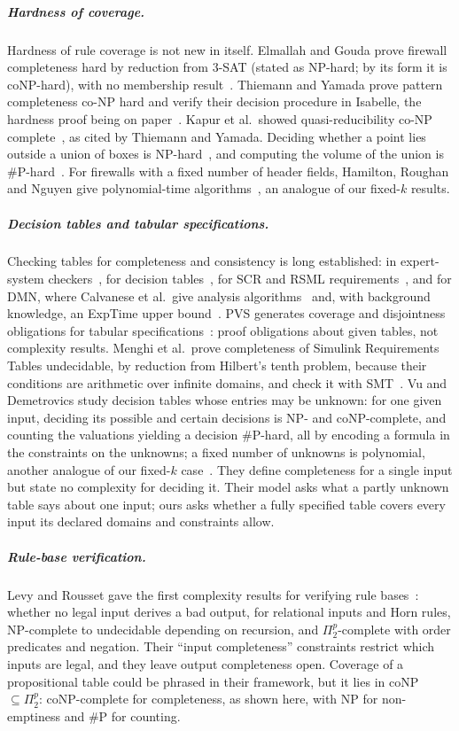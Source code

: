 \documentclass[a4paper,UKenglish,cleveref,autoref,thm-restate]{lipics-v2021}
\begin{document}
\subparagraph*{Hardness of coverage.}
Hardness of rule coverage is not new in itself. Elmallah and Gouda prove firewall completeness
hard by reduction from 3-SAT (stated as NP-hard; by its form it is coNP-hard), with no membership
result~\cite{ElmallahGouda2017}. Thiemann
and Yamada prove pattern completeness co-NP hard and verify their decision procedure in
Isabelle, the hardness proof being on paper~\cite{ThiemannYamada2026}. Kapur et al.\ showed
quasi-reducibility co-NP complete~\cite{KapurNRZ1991}, as cited by Thiemann and Yamada. Deciding
whether a point lies outside a union of boxes is NP-hard~\cite{Chan2010}, and computing the volume
of the union is \#P-hard~\cite{BringmannFriedrich2010}. For firewalls with a fixed number of header fields,
Hamilton, Roughan and Nguyen give polynomial-time algorithms~\cite{HamiltonRoughanNguyen2022},
an analogue of our fixed-$k$ results.

\subparagraph*{Decision tables and tabular specifications.}
Checking tables for completeness and consistency is long established: in expert-system
checkers~\cite{SuwaScottShortliffe1982}, for decision tables~\cite{VanthienenMA1998}, for SCR and
RSML requirements~\cite{HeitmeyerJL1996,HeimdahlLeveson1996}, and for DMN, where Calvanese et al.\
give analysis algorithms~\cite{CalvaneseDLMMT2016,CalvaneseDLMMT2018} and, with background
knowledge, an ExpTime upper bound~\cite{CalvaneseMDM2019}. PVS generates coverage and
disjointness obligations for tabular specifications~\cite{OwreRushbyShankar1997}: proof
obligations about given tables, not complexity results. Menghi et al.\ prove completeness of
Simulink Requirements Tables undecidable, by reduction from Hilbert's tenth problem, because
their conditions are arithmetic over infinite domains, and check it with
SMT~\cite{MenghiEtAl2025,ZanengaEtAl2025}. Vu and Demetrovics study decision tables whose entries
may be unknown: for one given input, deciding its possible and certain decisions is NP- and
coNP-complete, and counting the valuations yielding a decision \#P-hard, all by encoding a formula
in the constraints on the unknowns; a fixed number of unknowns is polynomial, another analogue of
our fixed-$k$ case~\cite{VuDemetrovics2026}. They define completeness for a single input but state
no complexity for deciding it. Their model asks what a partly unknown table says about one input;
ours asks whether a fully specified table covers every input its declared domains and constraints
allow.

\subparagraph*{Rule-base verification.}
Levy and Rousset gave the first complexity results for verifying rule
bases~\cite{LevyRousset1996,LevyRousset1998}: whether no legal input derives a bad output, for
relational inputs and Horn rules, NP-complete to undecidable depending on recursion, and
$\Pi_2^p$-complete with order predicates and negation. Their ``input completeness'' constraints
restrict which inputs are legal, and they leave output completeness open. Coverage of a
propositional table could be phrased in their framework, but it lies in coNP~$\subseteq \Pi_2^p$:
coNP-complete for completeness, as shown here, with NP for non-emptiness and \#P for counting.
\end{document}
